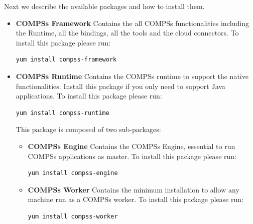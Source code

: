 \newpage
Next we describe the available packages and how to install them. 


\begin{itemize}
 \item \textbf{COMPSs Framework} \newline
       Contains the all COMPSs functionalities including the Runtime, all the bindings, all the tools and the cloud connectors.
       \newline
       To install this package please run:
       \begin{lstlisting}[language=bash]
	  yum install compss-framework
       \end{lstlisting}
 \item \textbf{COMPSs Runtime} \newline
       Contains the COMPSs runtime to support the native functionalities. Install this package if you only need to support Java
       applications.
       \newline
       To install this package please run:
       \begin{lstlisting}[language=bash]
	  yum install compss-runtime
       \end{lstlisting}
       This package is composed of two sub-packages:
       \begin{itemize}
        \item \textbf{COMPSs Engine} \newline
	      Contains the COMPSs Engine, essential to run COMPSs applications as master.
	      \newline
	      To install this package please run:
	      \begin{lstlisting}[language=bash]
		  yum install compss-engine
	      \end{lstlisting}
        \item \textbf{COMPSs Worker} \newline
              Contains the minimum installation to allow any machine run as a COMPSs worker.
              \newline
              To install this package please run:
	      \begin{lstlisting}[language=bash]
		  yum install compss-worker
	      \end{lstlisting}
       \end{itemize}


\end{itemize}
